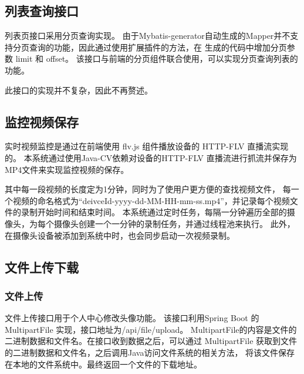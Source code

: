 \subsection{列表查询接口}
列表页接口采用分页查询实现。
由于Mybatis-generator自动生成的Mapper并不支持分页查询的功能，因此通过使用扩展插件的方法，在
生成的代码中增加分页参数 limit 和 offset。
该接口与前端的分页组件联合使用，可以实现分页查询列表的功能。

此接口的实现并不复杂，因此不再赘述。

\subsection{监控视频保存}
实时视频监控是通过在前端使用 flv.js 组件播放设备的 HTTP-FLV 直播流实现的。
本系统通过使用Java-CV依赖对设备的HTTP-FLV 直播流进行抓流并保存为MP4文件来实现监控视频的保存。

其中每一段视频的长度定为1分钟，同时为了使用户更方便的查找视频文件，
每一个视频的命名格式为“deivceId-yyyy-dd-MM-HH-mm-ss.mp4”，并记录每个视频文件的录制开始时间和结束时间。
本系统通过定时任务，每隔一分钟遍历全部的摄像头，为每个摄像头创建一个一分钟的录制任务，并通过线程池来执行。
此外，在摄像头设备被添加到系统中时，也会同步启动一次视频录制。

\subsection{文件上传下载}
\subsubsection{文件上传}
文件上传接口用于个人中心修改头像功能。
该接口利用Spring Boot 的 MultipartFile 实现，接口地址为/api/file/upload。
MultipartFile的内容是文件的二进制数据和文件名。在接口收到数据之后，可以通过 
MultipartFile 获取到文件的二进制数据和文件名，之后调用Java访问文件系统的相关方法，
将该文件保存在本地的文件系统中。最终返回一个文件的下载地址。



